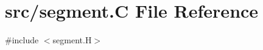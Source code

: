 \hypertarget{segment_8_c}{}\section{src/segment.C File Reference}
\label{segment_8_c}
{\ttfamily \#include $<$segment.\+H$>$}\newline
